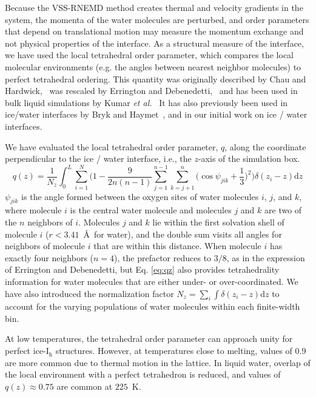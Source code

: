 Because the VSS-RNEMD method creates thermal and velocity gradients in
the system, the momenta of the water molecules are perturbed, and
order parameters that depend on translational motion may measure the
momentum exchange and not physical properties of the interface.  As a
structural measure of the interface, we have used the local
tetrahedral order parameter, which compares the local molecular
environments (e.g. the angles between nearest neighbor molecules) to
perfect tetrahedral ordering.  This quantity was originally described
by Chau and Hardwick,~\cite{Chau1998} was rescaled by Errington and
Debenedetti,~\cite{Errington2001} and has been used in bulk liquid 
simulations by Kumar \textit{et al.}~\cite{Kumar2009} It has also
previously been used in ice/water interfaces by Bryk and
Haymet~\cite{Bryk2004}, and in our initial work on ice / water
interfaces\cite{Louden2013}.

We have evaluated the local tetrahedral order parameter, $q$, along
the coordinate perpendicular to the ice / water interface, i.e., the
$z$-axis of the simulation box.
\begin{equation}
q(z) = \frac{1}{N_z} \int_0^L \sum_{i=1}^{N} \Bigg(1 -\frac{9}{2n(n-1)}\sum_{j=1}^{n-1}
\sum_{k=j+1}^{n} \bigg(\cos\psi_{jik}+\frac{1}{3}\bigg)^2\Bigg)
\delta(z_{i}-z)\mathrm{d}z 
\label{eq:qz}
\end{equation}
$\psi_{jik}$ is the angle formed between the oxygen sites of water
molecules $i$, $j$, and $k$, where molecule $i$ is the central water
molecule and molecules $j$ and $k$ are two of the $n$ neighbors of
$i$.  Molecules $j$ and $k$ lie within the first solvation shell of
molecule $i$ ($r < 3.41$~\AA\ for water), and the double sum visits
all angles for neighbors of molecule $i$ that are within this
distance.  When molecule $i$ has exactly four neighbors ($n=4$), the
prefactor reduces to $3/8$, as in the expression of Errington and
Debenedetti, but Eq. \eqref{eq:qz} also provides tetrahedrality
information for water molecules that are either under- or
over-coordinated. We have also introduced the normalization factor
$N_z = \sum_i \int \delta(z_i - z) \mathrm{d}z$ to account for the
varying populations of water molecules within each finite-width bin.

At low temperatures, the tetrahedral order parameter can approach
unity for perfect ice-I$_\mathrm{h}$ structures. However, at
temperatures close to melting, values of 0.9 are more common due to
thermal motion in the lattice. In liquid water, overlap of the local
environment with a perfect tetrahedron is reduced, and values of
$q(z) \approx 0.75$ are common at $225$~K.

